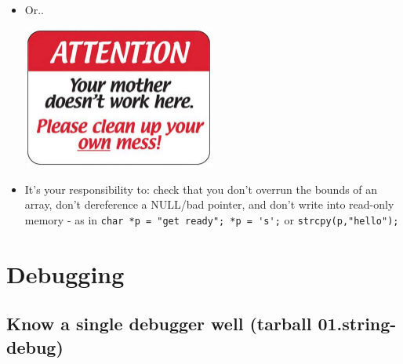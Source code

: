 \documentclass[aspectratio=169]{beamer}
\newcommand{\pitem}{\pause \item}
\begin{document}
\begin{frame}[fragile]

  \begin{itemize}

  \item
  Or..

  \begin{center}
  \includegraphics[width=0.5\textwidth]{img/cleanYourMess.jpeg}
  \end{center}

  \pitem
  \alert{It's your responsibility} to: check that you don't overrun the
  bounds of an array,
  \pause
  don't dereference a NULL/bad pointer,
  \pause
  and don't write into read-only memory - as in
  \verb+char *p = "get ready"; *p = 's';+ or \verb+strcpy(p,"hello");+

  \end{itemize}
\end{frame}

\section{Debugging}
\subsection{Know a single debugger well (tarball 01.string-debug)}
\end{document}
